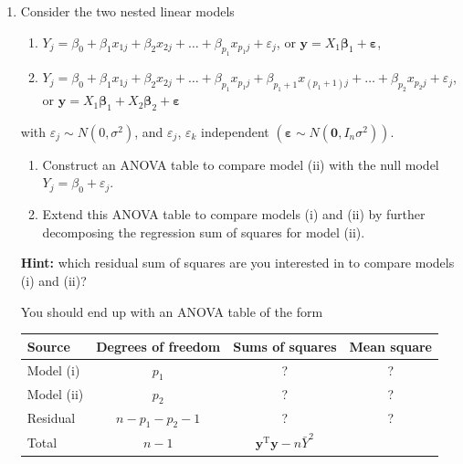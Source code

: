 \documentclass[
]{book}
\theoremstyle{definition}
\theoremstyle{definition}
\theoremstyle{definition}
\theoremstyle{definition}
\theoremstyle{remark}
\begin{document}
\begin{enumerate}
\def\labelenumi{\arabic{enumi}.}
\setcounter{enumi}{2}
\item
  Consider the two nested linear models

  \begin{enumerate}
  \def\labelenumii{(\roman{enumii})}
  \item
    \(Y_j = \beta_0 + \beta_1x_{1j} + \beta_2x_{2j} + \ldots + \beta_{p_1}x_{p_1j} + \varepsilon_j\), or \(\boldsymbol{y}= X_1\boldsymbol{\beta}_1 + \boldsymbol{\varepsilon}\),
  \item
    \(Y_j = \beta_0 + \beta_1x_{1j} + \beta_2x_{2j} + \ldots + \beta_{p_1}x_{p_1j} + \beta_{p_1+1}x_{(p_1+1)j} + \ldots + \beta_{p_2}x_{p_2j} + \varepsilon_j\), or \(\boldsymbol{y}= X_1\boldsymbol{\beta}_1 + X_2\boldsymbol{\beta}_2+ \boldsymbol{\varepsilon}\)
  \end{enumerate}

  with \(\varepsilon_j\sim N(0, \sigma^2)\), and \(\varepsilon_{j}\), \(\varepsilon_{k}\) independent \((\boldsymbol{\varepsilon}\sim N(\boldsymbol{0},I_n\sigma^2))\).

  \begin{enumerate}
  \def\labelenumii{\alph{enumii}.}
  \item
    Construct an ANOVA table to compare model (ii) with the null model \(Y_j=\beta_0 + \varepsilon_j\).
  \item
    Extend this ANOVA table to compare models (i) and (ii) by further decomposing the regression sum of squares for model (ii).
  \end{enumerate}

  \textbf{Hint:} which residual sum of squares are you interested in to compare models (i) and (ii)?

  You should end up with an ANOVA table of the form

  \begin{longtable}[]{@{}lccc@{}}
  \toprule()
  Source & Degrees of freedom & Sums of squares & Mean square \\
  \midrule()
  \endhead
  Model (i) & \(p_1\) & ? & ? \\
  Model (ii) & \(p_2\) & ? & ? \\
  Residual & \(n-p_1-p_2-1\) & ? & ? \\
  Total & \(n-1\) & \(\boldsymbol{y}^{\mathrm{T}}\boldsymbol{y}- n\bar{Y}^2\) & \\
  \bottomrule()
  \end{longtable}


\end{enumerate}
\end{document}

